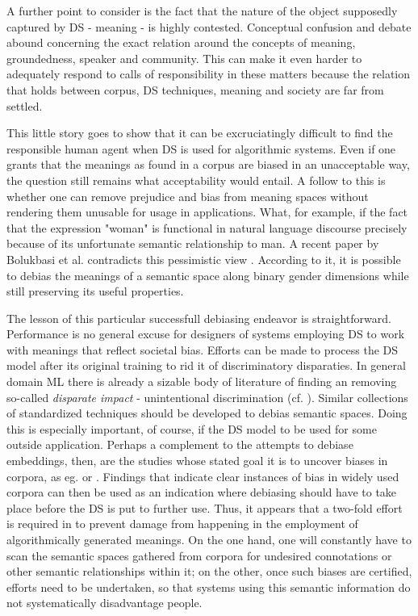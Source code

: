 \documentclass{article}
\begin{document}
A further point to consider is the fact that the nature of the object supposedly captured by DS - meaning - is highly contested. Conceptual confusion and debate abound concerning the exact relation around the concepts of meaning, groundedness, speaker and community. This can make it even harder to adequately respond to calls of responsibility in these matters because the relation that holds between corpus, DS techniques, meaning and society are far from settled. 

This little story goes to show that it can be excruciatingly difficult to find the responsible human agent when DS is used for algorithmic systems. Even if one grants that the meanings as found in a corpus are biased in an unacceptable way, the question still remains what acceptability would entail. A follow to this is whether one can remove prejudice and bias from meaning spaces without rendering them unusable for usage in applications. What, for example, if the fact that the expression "woman" is functional in natural language discourse precisely because of its unfortunate semantic relationship to man. A recent paper by Bolukbasi et al. contradicts this pessimistic view \cite{bolukbasi2016man}. According to it, it is possible to debias the meanings of a semantic space along binary gender dimensions while still preserving its useful properties.

The lesson of this particular successfull debiasing endeavor is straightforward. Performance is no general excuse for designers of systems employing DS to work with meanings that reflect societal bias. Efforts can be made to process the DS model after its original training to rid it of discriminatory disparaties. In general domain ML there is already a sizable body of literature of finding an removing so-called \emph{disparate impact} - unintentional discrimination (cf. \cite{feldman2015certifying} \cite{dwork2012fairness}). 
Similar collections of standardized techniques should be developed to debias semantic spaces. Doing this is especially important, of course, if the DS model to be used for some outside application. 
Perhaps a complement to the attempts to debiase embeddings, then, are the studies whose stated goal it is to uncover biases in corpora, as eg. \cite{wagner2015s} or \cite{herbelot2012distributional}. Findings that indicate clear instances of bias in widely used corpora can then be used as an indication where  debiasing should have to take place before the DS is put to further use.
Thus, it appears that a two-fold effort is required in to prevent damage from happening in the employment of algorithmically generated meanings. On the one hand, one will constantly have to scan the semantic spaces gathered from corpora for undesired connotations or other semantic relationships within it; on the other, once such biases are certified, efforts need to be undertaken, so that systems using this semantic information do not systematically disadvantage people.
\end{document}
